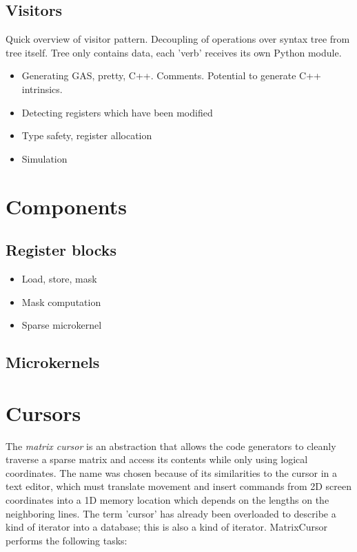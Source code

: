 \subsection{Visitors}
Quick overview of visitor pattern. Decoupling of operations over syntax tree from tree itself. Tree only contains data, each 'verb' receives its own Python module.

\begin{itemize}
  \item Generating GAS, pretty, C++. Comments. Potential to generate C++ intrinsics.
  \item Detecting registers which have been modified
  \item Type safety, register allocation
  \item Simulation
\end{itemize}


\section{Components}
\subsection{Register blocks}
\begin{itemize}
  \item Load, store, mask
  \item Mask computation
  \item Sparse microkernel
\end{itemize}

\subsection{Microkernels}

\section{Cursors}


    The \emph{matrix cursor} is an abstraction that allows the code generators to cleanly traverse a sparse matrix and access its contents while only using logical coordinates. The name was chosen because of its similarities to the cursor in a text editor, which must translate movement and insert commands from 2D screen coordinates into a 1D memory location which depends on the lengths on the neighboring lines. The term 'cursor' has already been overloaded to describe a kind of iterator into a database; this is also a kind of iterator. MatrixCursor performs the following tasks:

